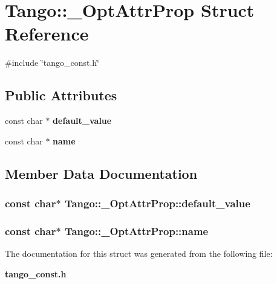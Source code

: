 \section{Tango\-:\-:\-\_\-\-Opt\-Attr\-Prop Struct Reference}
\label{structTango_1_1__OptAttrProp}


{\ttfamily \#include \char`\"{}tango\-\_\-const.\-h\char`\"{}}

\subsection*{Public Attributes}
\begin{DoxyCompactItemize}
\item 
const char $\ast$ {\bf default\-\_\-value}
\item 
const char $\ast$ {\bf name}
\end{DoxyCompactItemize}


\subsection{Member Data Documentation}
\subsubsection[{default\-\_\-value}]{\setlength{\rightskip}{0pt plus 5cm}const char$\ast$ Tango\-::\-\_\-\-Opt\-Attr\-Prop\-::default\-\_\-value}\label{structTango_1_1__OptAttrProp_ad536b06d0b4bdcf1c17e92d04c8277a3}
\subsubsection[{name}]{\setlength{\rightskip}{0pt plus 5cm}const char$\ast$ Tango\-::\-\_\-\-Opt\-Attr\-Prop\-::name}\label{structTango_1_1__OptAttrProp_a875ce1b529eade873f351853d13489fe}


The documentation for this struct was generated from the following file\-:\begin{DoxyCompactItemize}
\item 
{\bf tango\-\_\-const.\-h}\end{DoxyCompactItemize}
